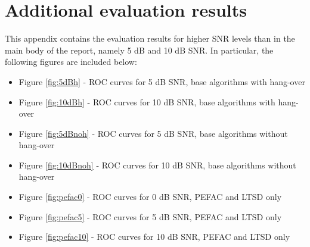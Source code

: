 
\chapter{Additional evaluation results} %

\label{AppendixA} %


This appendix contains the evaluation results for higher SNR levels than in the main body of the report, namely  5 dB and 10 dB SNR. In particular, the following figures are included below:

\begin{itemize}
\item Figure \ref{fig:5dBh} - ROC curves for 5 dB SNR, base algorithms with hang-over
\item Figure \ref{fig:10dBh} - ROC curves for 10 dB SNR, base algorithms with hang-over
\item Figure \ref{fig:5dBnoh} - ROC curves for 5 dB SNR, base algorithms without hang-over
\item Figure \ref{fig:10dBnoh} - ROC curves for 10 dB SNR, base algorithms without hang-over
\item Figure \ref{fig:pefac0} - ROC curves for 0 dB SNR, PEFAC and LTSD only
\item Figure \ref{fig:pefac5} - ROC curves for 5 dB SNR, PEFAC and LTSD only
\item Figure \ref{fig:pefac10} - ROC curves for 10 dB SNR, PEFAC and LTSD only
\end{itemize}

